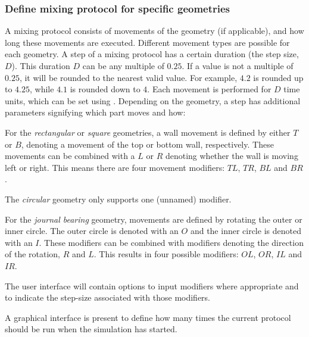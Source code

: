 \subsubsection{Define mixing protocol for specific geometries}
A mixing protocol consists of movements of the geometry (if applicable), and how long these movements are executed. Different movement types are possible for each geometry. A step of a mixing protocol has a certain duration (the step size, $D$). This duration $D$ can be any multiple of $0.25$. If a value is not a multiple of $0.25$, it will be rounded to the nearest valid value. For example, $4.2$ is rounded up to $4.25$, while $4.1$ is rounded down to $4$. Each movement is performed for $D$ time units, which can be set using . Depending on the geometry, a step has additional parameters signifying which part moves and how:

\fpstartparagraph{} For the \emph{rectangular} or \emph{square} geometries, a wall movement is defined by either $T$ or $B$, denoting a movement of the top or bottom wall, respectively. These movements can be combined with a $L$ or $R$ denoting whether the wall is moving left or right. This means there are four movement modifiers: $TL$, $TR$, $BL$ and $BR$.

The \emph{circular} geometry only supports one (unnamed) modifier.

For the \emph{journal bearing} geometry, movements are defined by rotating the outer or inner circle. The outer circle is denoted with an $O$ and the inner circle is denoted with an $I$. These modifiers can be combined with modifiers denoting the direction of the rotation, $R$ and $L$. This results in four possible modifiers: $OL$, $OR$, $IL$ and $IR$.

The user interface will contain options to input modifiers where appropriate and to indicate the step-size associated with those modifiers.

\fpstartparagraph{} A graphical interface is present to define how many times the current protocol should be run when the simulation has started.




